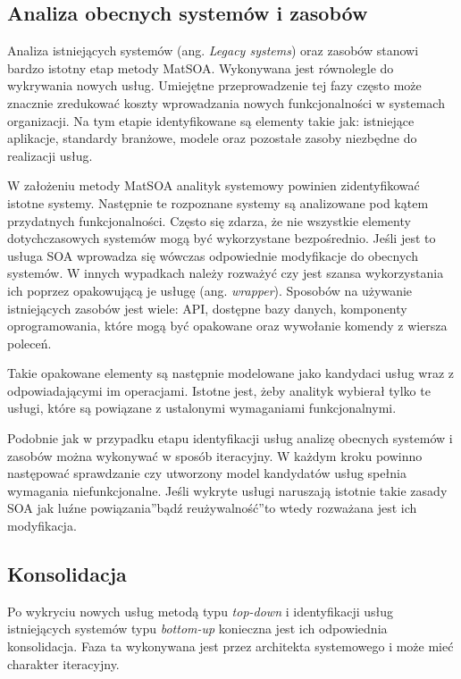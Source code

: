\subsection*{Analiza obecnych systemów i zasobów}
Analiza istniejących systemów (ang. \emph{Legacy systems}) oraz zasobów stanowi bardzo istotny etap metody MatSOA. Wykonywana jest równolegle do wykrywania nowych usług. Umiejętne przeprowadzenie tej fazy często może znacznie zredukować koszty wprowadzania nowych funkcjonalności w systemach organizacji. Na tym etapie identyfikowane są elementy takie jak: istniejące aplikacje, standardy branżowe, modele oraz pozostałe zasoby niezbędne do realizacji usług. 

W założeniu metody MatSOA analityk systemowy powinien zidentyfikować istotne systemy. Następnie te rozpoznane systemy są analizowane pod kątem przydatnych funkcjonalności. Często się zdarza, że nie wszystkie elementy dotychczasowych systemów mogą być wykorzystane bezpośrednio. Jeśli jest to usługa SOA wprowadza się wówczas odpowiednie modyfikacje do obecnych systemów. W innych wypadkach należy rozważyć czy jest szansa wykorzystania ich poprzez opakowującą je usługę (ang. \emph{wrapper}). Sposobów na używanie istniejących zasobów jest wiele: API, dostępne bazy danych, komponenty oprogramowania, które mogą być opakowane oraz wywołanie komendy z wiersza poleceń.

Takie opakowane elementy są następnie modelowane jako kandydaci usług wraz z odpowiadającymi im operacjami. Istotne jest, żeby analityk wybierał tylko te usługi, które są powiązane z ustalonymi wymaganiami funkcjonalnymi.

Podobnie jak w przypadku etapu identyfikacji usług analizę obecnych systemów i zasobów można wykonywać w sposób iteracyjny. W każdym kroku powinno następować sprawdzanie czy utworzony model kandydatów usług spełnia wymagania niefunkcjonalne. Jeśli wykryte usługi naruszają istotnie takie zasady SOA jak \quotedblbase luźne powiązania\textquotedblright bądź \quotedblbase reużywalność\textquotedblright to wtedy rozważana jest ich modyfikacja.

\subsection{Konsolidacja}
Po wykryciu nowych usług metodą typu \emph{top-down} i identyfikacji usług istniejących systemów typu \emph{bottom-up} konieczna jest ich odpowiednia konsolidacja. Faza ta wykonywana jest przez architekta systemowego i może mieć charakter iteracyjny.

